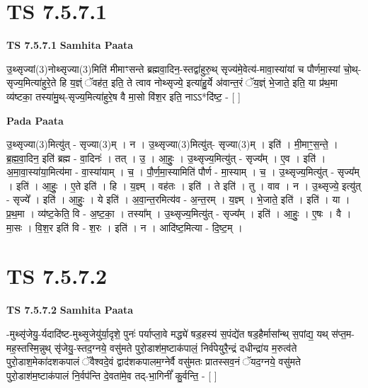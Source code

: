 \documentclass[17pt]{extarticle}
\begin{document}
\section*{ TS 7.5.7.1 }

\textbf{TS 7.5.7.1 } \newline
\textbf{Samhita Paata} \newline

उ॒थ्सृज्यां(3)नोथ्सृज्या(3)मिति॑ मीमाꣳसन्ते ब्रह्मवा॒दिन॒-स्तद्वा॑हुरु॒थ् सृज्य॑मे॒वेत्य॑-मावा॒स्या॑यां च पौर्णमा॒स्यां चो॒थ्-सृज्य॒मित्या॑हुरे॒ते हि य॒ज्ञ्ं ॅवह॑त॒ इति॒ ते त्वाव नोथ्सृज्ये॒ इत्या॑हु॒र्ये अ॑वान्त॒रं ॅय॒ज्ञ्ं भे॒जाते॒ इति॒ या प्र॑थ॒मा व्य॑ष्टका॒ तस्या॑मु॒थ्-सृज्य॒मित्या॑हुरे॒ष वै मा॒सो वि॑श॒र इति॒ नाऽऽ*दि॑ष्ट॒ - [  ] \newline

\textbf{Pada Paata} \newline

उ॒थ्सृज्या(3)मित्यु॑त् - सृज्या(3)म् । न । उ॒थ्सृज्या(3)मित्यु॑त्- सृज्या(3)म् । इति॑ । मी॒माꣳ॒॒स॒न्ते॒ । ब्र॒ह्म॒वा॒दिन॒ इति॑ ब्रह्म - वा॒दिनः॑ । तत् । उ॒ । आ॒हुः॒ । उ॒थ्सृज्य॒मित्यु॑त् - सृज्य᳚म् । ए॒व । इति॑ । अ॒मा॒वा॒स्या॑या॒मित्य॑मा - वा॒स्या॑याम् । च॒ । पौ॒र्ण॒मा॒स्यामिति॑ पौर्ण - मा॒स्याम् । च॒ । उ॒थ्सृज्य॒मित्यु॑त् - सृज्य᳚म् । इति॑ । आ॒हुः॒ । ए॒ते इति॑ । हि । य॒ज्ञ्म् । वह॑तः । इति॑ । ते इति॑ । तु । वाव । न । उ॒थ्सृज्ये॒ इत्यु॑त् - सृज्ये᳚ । इति॑ । आ॒हुः॒ । ये इति॑ । अ॒वा॒न्त॒रमित्य॑व - अ॒न्त॒रम् । य॒ज्ञ्म् । भे॒जाते॒ इति॑ । इति॑ । या । प्र॒थ॒मा । व्य॑ष्ट॒केति॒ वि - अ॒ष्ट॒का॒ । तस्या᳚म् । उ॒थ्सृज्य॒मित्यु॑त् - सृज्य᳚म् । इति॑ । आ॒हुः॒ । ए॒षः । वै । मा॒सः । वि॒श॒र इति॑ वि - श॒रः । इति॑ । न । आदि॑ष्ट॒मित्या - दि॒ष्ट॒म् ।  \newline




\section*{ TS 7.5.7.2 }

\textbf{TS 7.5.7.2 } \newline
\textbf{Samhita Paata} \newline

-मुथ्सृ॑जेयु॒-र्यदादि॑ष्ट-मुथ्सृ॒जेयु॑र्या॒दृशे॒ पुनः॑ पर्याप्ला॒वे मद्ध्ये॑ षड॒हस्य॑ स॒पंद्ये॑त षड॒हैर्मासा᳚न्थ् स॒पांद्य॒ यथ् स॑प्त॒म- मह॒स्तस्मि॒न्नुथ् सृ॑जेयु॒-स्तद॒ग्नये॒ वसु॑मते पुरो॒डाश॑म॒ष्टाक॑पालं॒ निर्व॑पेयुरै॒न्द्रं दधीन्द्रा॑य म॒रुत्व॑ते पुरो॒डाश॒मेका॑दशकपालं ॅवैश्वदे॒वं द्वाद॑शकपालम॒ग्नेर्वै वसु॑मतः प्रातस्सव॒नं ॅयद॒ग्नये॒ वसु॑मते पुरो॒डाश॑म॒ष्टाक॑पालं नि॒र्वप॑न्ति दे॒वता॑मे॒व तद्-भा॒गिनीं᳚ कु॒र्वन्ति॒ - [  ] \newline
\end{document}
